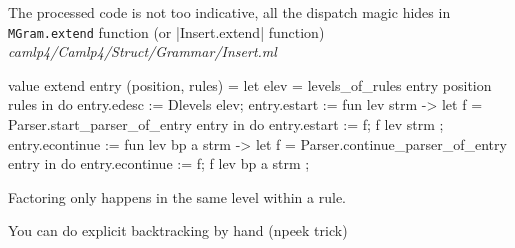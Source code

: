 The processed code is not too indicative, all the dispatch magic
hides in \verb|MGram.extend| function (or |Insert.extend| function)
\textit{camlp4/Camlp4/Struct/Grammar/Insert.ml}

\begin{bluecode}
value extend entry (position, rules) =
      let elev = levels_of_rules entry position rules in
      do {
        entry.edesc := Dlevels elev;
        entry.estart :=
          fun lev strm ->
            let f = Parser.start_parser_of_entry entry in
            do { entry.estart := f; f lev strm };
        entry.econtinue :=
          fun lev bp a strm ->
            let f = Parser.continue_parser_of_entry entry in
            do { entry.econtinue := f; f lev bp a strm }
      };
\end{bluecode}


Factoring only happens in the same level within a rule.

You can do explicit backtracking by hand (npeek trick)
\inputminted{ocaml}{calmp4/code/parser2.ml}





